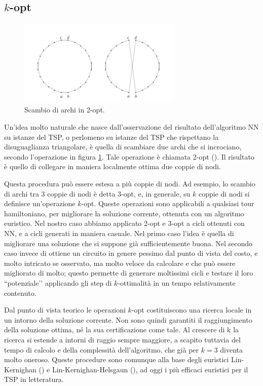 \subsection{$k$-opt}
\begin{figure}
  \begin{center}
    \includegraphics[width=0.7\textwidth]{images/2opt}
    \caption{Scambio di archi in 2-opt.}
    \label{fig:2opt}
  \end{center}
\end{figure}
Un’idea molto naturale che nasce dall’osservazione del risultato dell’algoritmo NN su istanze del TSP, o perlomeno su istanze del TSP che rispettano la disuguaglianza triangolare, è quella di scambiare due archi che si incrociano, secondo l’operazione in figura \ref{fig:2opt}. Tale operazione è chiamata 2-opt (\citet*{croes1958method}). Il risultato è quello di collegare in maniera localmente ottima due coppie di nodi.

Questa procedura può essere estesa a più coppie di nodi. Ad esempio, lo scambio di archi tra 3 coppie di nodi è detta 3-opt, e, in generale, su $k$ coppie di nodi si definisce un’operazione $k$-opt. Queste operazioni sono applicabili a qualsiasi tour hamiltoniano, per migliorare la soluzione corrente, ottenuta con un algoritmo euristico. Nel nostro caso abbiamo applicato 2-opt e 3-opt a cicli ottenuti con NN, e a cicli generati in maniera casuale. Nel primo caso l’idea è quella di migliorare una soluzione che si suppone già sufficientemente buona. Nel secondo caso invece di ottiene un circuito in genere pessimo dal punto di vista del costo, e molto intricato se osservato, ma molto veloce da calcolare e che può essere migliorato di molto; questo permette di generare moltissimi cicli e testare il loro ``potenziale’’ applicando gli step di $k$-ottimalità in un tempo relativamente contenuto.

Dal punto di vista teorico le operazioni $k$-opt costituiscono una ricerca locale in un intorno della soluzione corrente. Non sono quindi garantiti il raggiungimento della soluzione ottima, né la sua certificazione come tale. Al crescere di k la ricerca si estende a intorni di raggio sempre maggiore, a scapito tuttavia del tempo di calcolo e della complessità dell’algoritmo, che già per $k=3$ diventa molto oneroso. Queste procedure sono comunque alla base degli euristici Lin-Kernighan (\citet*{lin1973effective}) e Lin-Kernighan-Helsgaun (\citet*{helsgaun2000effective}), ad oggi i più efficaci euristici per il TSP in letteratura.

